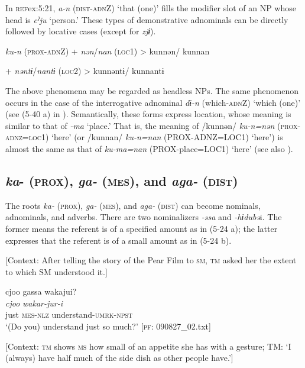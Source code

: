 In \textsc{ref}{ex:5:21}, \textit{a-n} (\textsc{dist}-\textsc{adn}Z) ‘that (one)’ fills the modifier slot of an NP whose head is \textit{cˀju} ‘person.’ These types of demonstrative adnominals can be directly followed by locative cases (except for \textit{zjɨ}).

\ea \label{ex:5:23}   \textit{ku-n}  (\textsc{prox}-\textsc{adn}Z)  +  \textit{nən}/\textit{nan}  (\textsc{loc}1)  >  kunnən/ kunnan

      +  \textit{nəntɨ}/\textit{nantɨ}  (\textsc{loc}2)  >  kunnəntɨ/ kunnantɨ
\z

The above phenomena may be regarded as headless NPs. The same phenomenon occurs in the case of the interrogative adnominal \textit{dɨ-n} (which-\textsc{adn}Z) ‘which (one)’ (see (5-40 a) in ). Semantically, these forms express location, whose meaning is similar to that of \textit{{}-ma} ‘place.’ That is, the meaning of /kunnən/ \textit{ku-n=nən} (\textsc{prox}-\textsc{adnz}=\textsc{loc}1) ‘here’ (or /kunnan/ \textit{ku-n=nan} (PROX-ADNZ=LOC1) ‘here’) is almost the same as that of \textit{ku-ma=nan} (PROX-place=LOC1) ‘here’ (see also ).

\subsection{\textit{ka}{}- (\textsc{prox}), \textit{ga-} (\textsc{mes}), and \textit{aga-} (\textsc{dist})}

The roots \textit{ka-} (\textsc{prox}), \textit{ga-} (\textsc{mes}), and \textit{aga-} (\textsc{dist}) can become nominals, adnominals, and adverbs. There are two nominalizers \textit{{}-ssa} and \textit{{}-hɨdubə}i. The former means the referent is of a specified amount as in (5-24 a); the latter expresses that the referent is of a small amount as in (5-24 b).

\ea \label{ex:5:24}  \ea \label{ex:5:24a} [Context: After telling the story of the Pear Film to \textsc{sm}, \textsc{tm} asked her the extent to which SM understood it.]

\glll  cjoo  gassa  wakajui?\\
\textit{cjoo}  \textit{}  \textit{wakar-jur-i}\\
just  \textsc{mes}-\textsc{nlz}  understand-\textsc{umrk}-\textsc{npst}\\
\glt ‘(Do you) understand just so much?’ [\textsc{pf}: 090827\_02.txt]

 \ex \label{ex:5:24b} [Context: \textsc{tm} shows \textsc{ms} how small of an appetite she has with a gesture; TM: ‘I (always) have half much of the side dish as other people have.’]


